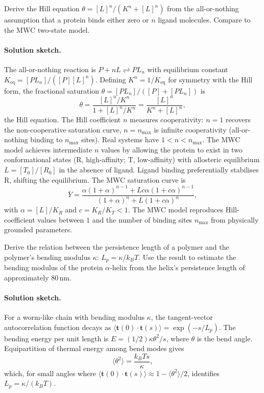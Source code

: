 \begin{exercise}
Derive the Hill equation $\theta = [L]^n/(K^n + [L]^n)$ from the
all-or-nothing assumption that a protein binds either zero or $n$
ligand molecules. Compare to the MWC two-state model.
\end{exercise}

\paragraph{Solution sketch.}
The all-or-nothing reaction is $P + n L \rightleftharpoons P L_n$
with equilibrium constant $K_{\text{eq}} = [P L_n]/([P][L]^n)$.
Defining $K^n = 1/K_{\text{eq}}$ for symmetry with the Hill form,
the fractional saturation $\theta = [P L_n]/([P] + [P L_n])$ is
\[
\theta = \frac{[L]^n / K^n}{1 + [L]^n / K^n} = \frac{[L]^n}{K^n + [L]^n},
\]
the Hill equation. The Hill coefficient $n$ measures cooperativity:
$n = 1$ recovers the non-cooperative saturation curve, $n = n_{\max}$
is infinite cooperativity (all-or-nothing binding to $n_{\max}$
sites). Real systems have $1 < n < n_{\max}$. The MWC model
\cite{paper:v6c04-monod-wyman-changeux-1965} achieves intermediate
$n$ values by allowing the protein to exist in two conformational
states (R, high-affinity; T, low-affinity) with allosteric equilibrium
$L = [T_0]/[R_0]$ in the absence of ligand. Ligand binding
preferentially stabilises R, shifting the equilibrium. The MWC
saturation curve is
\[
\bar Y = \frac{\alpha (1+\alpha)^{n-1} + L c \alpha (1 + c \alpha)^{n-1}}
{(1+\alpha)^n + L (1 + c \alpha)^n},
\]
with $\alpha = [L]/K_R$ and $c = K_R/K_T < 1$. The MWC model
reproduces Hill-coefficient values between $1$ and the number of
binding sites $n_{\max}$ from physically grounded parameters.

\begin{exercise}
Derive the relation between the persistence length of a polymer and
the polymer's bending modulus $\kappa$: $L_p = \kappa/k_B T$. Use
the result to estimate the bending modulus of the protein
$\alpha$-helix from the helix's persistence length of approximately
$80\,\text{nm}$.
\end{exercise}

\paragraph{Solution sketch.}
For a worm-like chain with bending modulus $\kappa$, the tangent-vector
autocorrelation function decays as $\langle \mathbf{t}(0) \cdot
\mathbf{t}(s) \rangle = \exp(-s/L_p)$. The bending energy per unit
length is $E = (1/2) \kappa \theta^2/s$, where $\theta$ is the bend
angle. Equipartition of thermal energy among bend modes gives
\[
\langle \theta^2 \rangle = \frac{k_B T s}{\kappa},
\]
which, for small angles where $\langle \mathbf{t}(0) \cdot \mathbf{t}(s)
\rangle \approx 1 - \langle \theta^2 \rangle / 2$, identifies
$L_p = \kappa / (k_B T)$.

